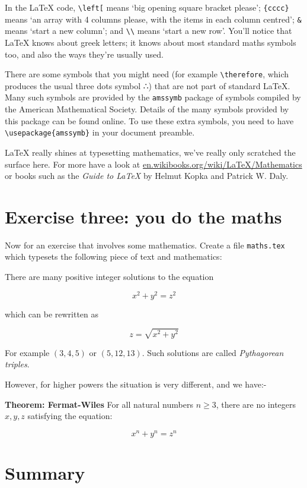 \documentclass[
]{book}
\begin{document}
In the LaTeX code, \texttt{\textbackslash{}left{[}} means `big opening square bracket please'; \texttt{\{cccc\}} means `an array with 4 columns please, with the items in each column centred'; \texttt{\&} means `start a new column'; and \texttt{\textbackslash{}\textbackslash{}} means `start a new row'. You'll notice that LaTeX knows about greek letters; it knows about most standard maths symbols too, and also the ways they're usually used.

There are some symbols that you might need (for example \texttt{\textbackslash{}therefore}, which produces the usual three dots symbol ∴) that are not part of standard LaTeX. Many such symbols are provided by the \texttt{amssymb} package of symbols compiled by the American Mathematical Society. Details of the many symbols provided by this package can be found online. To use these extra symbols, you need to have \texttt{\textbackslash{}usepackage\{amssymb\}} in your document preamble.

LaTeX really shines at typesetting mathematics, we've really only scratched the surface here. For more have a look at
\href{https://en.wikibooks.org/wiki/LaTeX/Mathematics}{en.wikibooks.org/wiki/LaTeX/Mathematics} or books such as the \emph{Guide to LaTeX} by Helmut Kopka and Patrick W. Daly. \citep{kopka}

\section{Exercise three: you do the maths}\label{ex3}

Now for an exercise that involves some mathematics. Create a file \texttt{maths.tex} which typesets the following piece of text and mathematics:

There are many positive integer solutions to the equation

\[ x^2 + y^2 =  z^2 \]

which can be rewritten as

\[ z = \sqrt{x^2 + y^2} \]

For example \((3,4, 5)\) or \((5,12,13)\). Such solutions are called \emph{Pythagorean triples}.

However, for higher powers the situation is very different, and we have:-

\textbf{Theorem: Fermat-Wiles}
For all natural numbers \(n ≥ 3\), there are no integers \(x,y,z\) satisfying the equation:

\[ x^n + y^n = z^n \]

\section{Summary}\label{mathconc}
\end{document}
